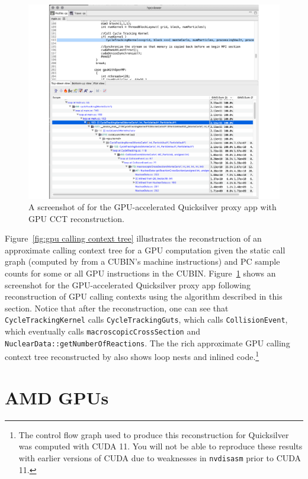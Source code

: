 \begin{figure}[t]
\centering
\includegraphics[width=\textwidth]{fig/qs-cct.pdf}
\caption{A screenshot of \hpcviewer{} for the GPU-accelerated Quicksilver proxy app with GPU CCT reconstruction.}
\label{qs-cct}
\end{figure}

Figure~\ref{fig:gpu calling context tree} illustrates the reconstruction of an approximate calling context tree for a GPU computation given the static call graph (computed by \hpcstruct{} from a CUBIN's machine instructions) and PC sample counts for some or all GPU instructions in the CUBIN. Figure~\ref{qs-cct} shows an \hpcviewer{} screenshot for the GPU-accelerated Quicksilver proxy app following reconstruction of GPU calling contexts using the algorithm described in this section. Notice that after the reconstruction, one can see that \verb|CycleTrackingKernel| calls \verb|CycleTrackingGuts|, which calls \verb|CollisionEvent|, which eventually calls  \verb|macroscopicCrossSection| and \verb|NuclearData::getNumberOfReactions|. The the rich  approximate GPU calling context tree reconstructed by \hpcprof{} also shows loop nests and inlined code.\footnote{The control flow graph used to produce this reconstruction for Quicksilver was computed with CUDA 11. You will not be able to reproduce these results with earlier versions of CUDA due to weaknesses in  
{\tt nvdisasm} prior to CUDA 11.}



\section{AMD GPUs}

